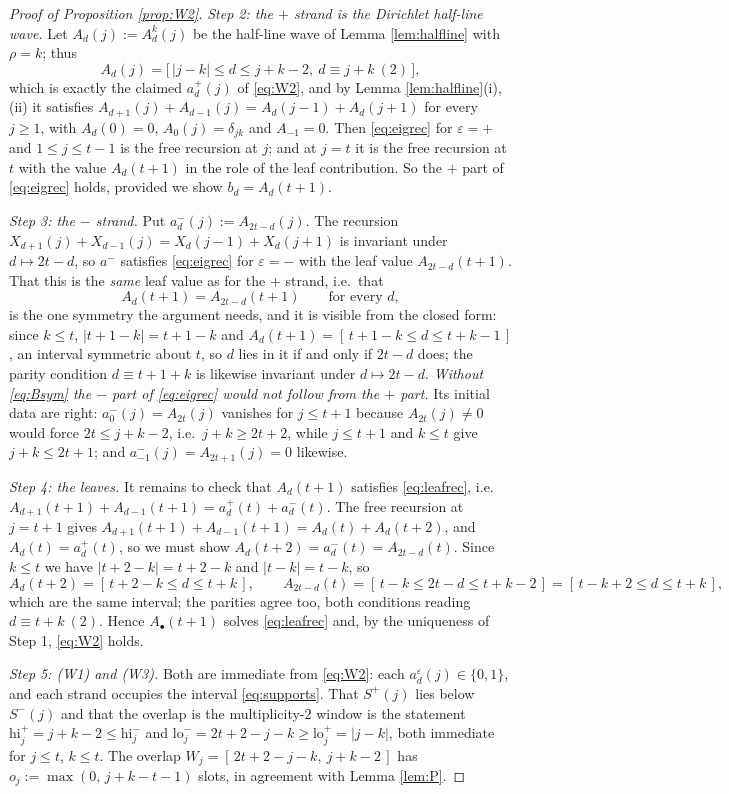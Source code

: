 \documentclass[reqno]{amsart}
\theoremstyle{plain}
\theoremstyle{definition}
\newcommand{\eps}{\varepsilon}
\newcommand{\hi}{\mathrm{hi}}
\newcommand{\lo}{\mathrm{lo}}
\begin{document}
\begin{proof}[Proof of Proposition \ref{prop:W2}]
\emph{Step 2: the $+$ strand is the Dirichlet half-line wave.}  Let
$A_d(j):=A^{k}_d(j)$ be the half-line wave of Lemma \ref{lem:halfline} with
$\rho=k$; thus
\[
   A_d(j)=\bigl[\,|j-k|\le d\le j+k-2,\ d\equiv j+k\ (2)\,\bigr],
\]
which is exactly the claimed $a^{+}_d(j)$ of \eqref{eq:W2}, and by Lemma
\ref{lem:halfline}(i),(ii) it satisfies
$A_{d+1}(j)+A_{d-1}(j)=A_d(j-1)+A_d(j+1)$ for every $j\ge1$, with $A_d(0)=0$,
$A_0(j)=\delta_{jk}$ and $A_{-1}=0$.  Then
\eqref{eq:eigrec} for $\eps=+$ and
$1\le j\le t-1$ is the free recursion at $j$; and at $j=t$ it is the free
recursion at $t$ with the value $A_d(t+1)$ in the role of the leaf
contribution.  So the $+$ part of \eqref{eq:eigrec} holds, provided we show
$b_d=A_d(t+1)$.

\emph{Step 3: the $-$ strand.}  Put $a^{-}_d(j):=A_{2t-d}(j)$.  The recursion
$X_{d+1}(j)+X_{d-1}(j)=X_d(j-1)+X_d(j+1)$ is invariant under $d\mapsto 2t-d$,
so $a^{-}$ satisfies \eqref{eq:eigrec} for $\eps=-$ with the leaf value
$A_{2t-d}(t+1)$.  That this is the \emph{same} leaf value as for the $+$ strand,
i.e.\ that
\begin{equation}\label{eq:Bsym}
   A_d(t+1)=A_{2t-d}(t+1)\qquad\text{for every } d,
\end{equation}
is the one symmetry the argument needs, and it is visible from the closed
form: since $k\le t$, $|t+1-k|=t+1-k$ and
$A_d(t+1)=[\,t+1-k\le d\le t+k-1\,]$, an interval symmetric about $t$, so
$d$ lies in it if and only if $2t-d$ does; the parity condition
$d\equiv t+1+k$ is likewise invariant under $d\mapsto2t-d$.  \emph{Without
\eqref{eq:Bsym} the $-$ part of \eqref{eq:eigrec} would not follow from the
$+$ part.}  Its initial data are right: $a^{-}_0(j)=A_{2t}(j)$ vanishes for
$j\le t+1$ because $A_{2t}(j)\ne0$ would force $2t\le j+k-2$, i.e.\
$j+k\ge 2t+2$, while $j\le t+1$ and $k\le t$ give $j+k\le 2t+1$; and
$a^{-}_{-1}(j)=A_{2t+1}(j)=0$ likewise.

\emph{Step 4: the leaves.}  It remains to check that $A_d(t+1)$ satisfies
\eqref{eq:leafrec}, i.e.\ $A_{d+1}(t+1)+A_{d-1}(t+1)=a^{+}_d(t)+a^{-}_d(t)$.
The free recursion at $j=t+1$ gives
$A_{d+1}(t+1)+A_{d-1}(t+1)=A_d(t)+A_d(t+2)$, and
$A_d(t)=a^{+}_d(t)$, so we must show $A_d(t+2)=a^{-}_d(t)=A_{2t-d}(t)$.  Since
$k\le t$ we have $|t+2-k|=t+2-k$ and $|t-k|=t-k$, so
\[
   A_d(t+2)=[\,t+2-k\le d\le t+k\,],
   \qquad
   A_{2t-d}(t)=[\,t-k\le 2t-d\le t+k-2\,]=[\,t-k+2\le d\le t+k\,],
\]
which are the same interval; the parities agree too, both conditions reading
$d\equiv t+k\ (2)$.  Hence $A_\bullet(t+1)$ solves \eqref{eq:leafrec} and, by the
uniqueness of Step 1, \eqref{eq:W2} holds.

\emph{Step 5: (W1) and (W3).}  Both are immediate from \eqref{eq:W2}: each
$a^{\eps}_d(j)\in\{0,1\}$, and each strand occupies the interval
\eqref{eq:supports}.  That $S^{+}(j)$ lies below $S^{-}(j)$ and that the
overlap is the multiplicity-$2$ window is the statement
$\hi^{+}_j=j+k-2\le \hi^-_j$ and $\lo^-_j=2t+2-j-k\ge\lo^+_j=|j-k|$, both
immediate for $j\le t$, $k\le t$.  The overlap
$W_j=[\,2t+2-j-k,\ j+k-2\,]$ has
$o_j:=\max(0,\,j+k-t-1)$ slots, in agreement with Lemma \ref{lem:P}.
\end{proof}
\end{document}
